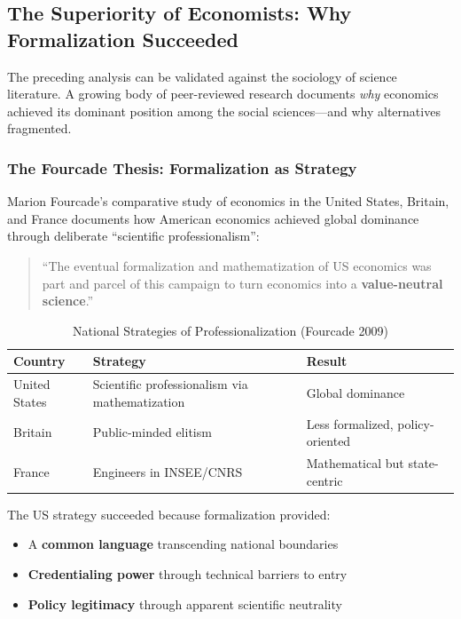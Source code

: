 
\subsection{The Superiority of Economists: Why Formalization Succeeded}
\label{sec:meta-superiority}

The preceding analysis can be validated against the sociology of science literature.
A growing body of peer-reviewed research documents \textit{why} economics achieved
its dominant position among the social sciences---and why alternatives fragmented.

\subsubsection{The Fourcade Thesis: Formalization as Strategy}

Marion Fourcade's comparative study of economics in the United States, Britain,
and France \citep{fourcade2009} documents how American economics achieved global
dominance through deliberate ``scientific professionalism'':

\begin{quote}
``The eventual formalization and mathematization of US economics was part and
parcel of this campaign to turn economics into a \textbf{value-neutral science}.''
\end{quote}

\begin{table}[htbp]
\centering
\caption{National Strategies of Professionalization (Fourcade 2009)}
\label{tab:fourcade-national}
\renewcommand{\arraystretch}{1.3}
\small
\begin{tabular}{@{}lll@{}}
\toprule
\textbf{Country} & \textbf{Strategy} & \textbf{Result} \\
\midrule
United States & Scientific professionalism via mathematization & Global dominance \\
Britain & Public-minded elitism & Less formalized, policy-oriented \\
France & Engineers in INSEE/CNRS & Mathematical but state-centric \\
\bottomrule
\end{tabular}
\end{table}

The US strategy succeeded because formalization provided:
\begin{itemize}[nosep]
    \item A \textbf{common language} transcending national boundaries
    \item \textbf{Credentialing power} through technical barriers to entry
    \item \textbf{Policy legitimacy} through apparent scientific neutrality
\end{itemize}

